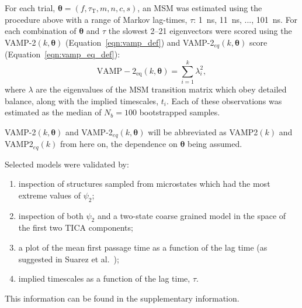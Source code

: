 \documentclass[journal=jacsat,manuscript=article]{achemso}
\begin{document}
For each trial,  $\bm{\theta} = (f, \tau_{\mathrm{T}}, m, n, c, s)$,  an MSM was estimated using the procedure above with a range of Markov lag-times, $\tau$: \SI{1}{\nano\second}, \SI{11}{\nano\second}, ..., \SI{101}{\nano\second}. For each combination of $\bm{\theta}$ and  $\tau$ the slowest \numrange{2}{21} eigenvectors were scored using the VAMP-2$(k, \bm{\theta})$ (Equation~\ref{eqn:vamp_def}) and  VAMP-2$_{eq}(k, \bm{\theta})$ score (Equation~\ref{eqn:vamp_eq_def}):
\begin{equation}
    \operatorname{VAMP-2_{eq}}(k, \bm{\theta}) = \sum_{i=1}^{k}\lambda_{i}^{2}, \label{eqn:vamp_eq_def}
\end{equation}
where $\lambda$ are the eigenvalues of the MSM transition matrix which obey detailed balance, along with the implied timescales, $t_i$.  Each of these observations was estimated as the median of $N_b=100$ bootstrapped samples. 

VAMP-2$(k, \bm{\theta})$ and VAMP-2$_{eq}(k, \bm{\theta})$ will be abbreviated as VAMP2$(k)$ and VAMP2$_{eq}(k)$ from here on, the dependence on $\bm{\theta}$ being assumed. 

Selected models were validated by: 
\begin{enumerate}
    \item inspection of structures sampled from microstates which had the most extreme values of $\psi_2$;
    \item inspection of both $\psi_2$ and a two-state coarse grained model in the space of the first two TICA components;
    \item a plot of the mean first passage time as a function of the lag time (as suggested in Suarez et al.~\cite{suarezWhatMarkovState2021});
    \item implied timescales as a function of the lag time, $\tau$.
\end{enumerate} 

This information can be found in the supplementary information. 
\end{document}
